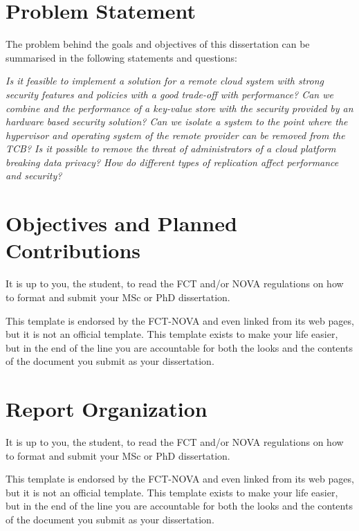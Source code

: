 
\section{Problem Statement} %
\label{sec:problem_statement}

The problem behind the goals and objectives of this dissertation can be summarised in the following statements and questions:

\textit{Is it feasible to implement a solution for a remote cloud system with strong security features and policies with a good trade-off with performance? Can we combine and the performance of a key-value store with the security provided by an hardware based security solution? Can we isolate a system to the point where the hypervisor and operating system of the remote provider can be removed from the \gls{TCB}? Is it possible to remove the threat of administrators of a cloud platform breaking data privacy? How do different types of replication affect performance and security?}

\section{Objectives and Planned Contributions} %
\label{sec:objectives_and_planned_contributions}

It is up to you, the student, to read the FCT and/or NOVA regulations on how to format and submit your MSc or PhD dissertation.  

This template is endorsed by the FCT-NOVA and even linked from its web pages, but it is not an official template.
%
This template exists to make your life easier, but in the end of the line you are accountable for both the looks and the contents of the document you submit as your dissertation.

\section{Report Organization}
\label{report_organization}

It is up to you, the student, to read the FCT and/or NOVA regulations on how to format and submit your MSc or PhD dissertation.  

This template is endorsed by the FCT-NOVA and even linked from its web pages, but it is not an official template.
%
This template exists to make your life easier, but in the end of the line you are accountable for both the looks and the contents of the document you submit as your dissertation.
